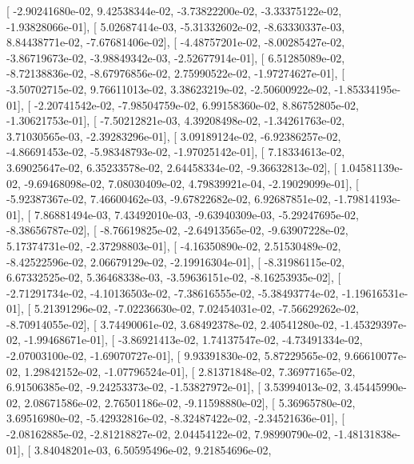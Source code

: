 \documentclass{article}
\begin{document}
       [ -2.90241680e-02,   9.42538344e-02,  -3.73822200e-02,
         -3.33375122e-02,  -1.93828066e-01],
       [  5.02687414e-03,  -5.31332602e-02,  -8.63330337e-03,
          8.84438771e-02,  -7.67681406e-02],
       [ -4.48757201e-02,  -8.00285427e-02,  -3.86719673e-02,
         -3.98849342e-03,  -2.52677914e-01],
       [  6.51285089e-02,  -8.72138836e-02,  -8.67976856e-02,
          2.75990522e-02,  -1.97274627e-01],
       [ -3.50702715e-02,   9.76611013e-02,   3.38623219e-02,
         -2.50600922e-02,  -1.85334195e-01],
       [ -2.20741542e-02,  -7.98504759e-02,   6.99158360e-02,
          8.86752805e-02,  -1.30621753e-01],
       [ -7.50212821e-03,   4.39208498e-02,  -1.34261763e-02,
          3.71030565e-03,  -2.39283296e-01],
       [  3.09189124e-02,  -6.92386257e-02,  -4.86691453e-02,
         -5.98348793e-02,  -1.97025142e-01],
       [  7.18334613e-02,   3.69025647e-02,   6.35233578e-02,
          2.64458334e-02,  -9.36632813e-02],
       [  1.04581139e-02,  -9.69468098e-02,   7.08030409e-02,
          4.79839921e-04,  -2.19029099e-01],
       [ -5.92387367e-02,   7.46600462e-03,  -9.67822682e-02,
          6.92687851e-02,  -1.79814193e-01],
       [  7.86881494e-03,   7.43492010e-03,  -9.63940309e-03,
         -5.29247695e-02,  -8.38656787e-02],
       [ -8.76619825e-02,  -2.64913565e-02,  -9.63907228e-02,
          5.17374731e-02,  -2.37298803e-01],
       [ -4.16350890e-02,   2.51530489e-02,  -8.42522596e-02,
          2.06679129e-02,  -2.19916304e-01],
       [ -8.31986115e-02,   6.67332525e-02,   5.36468338e-03,
         -3.59636151e-02,  -8.16253935e-02],
       [ -2.71291734e-02,  -4.10136503e-02,  -7.38616555e-02,
         -5.38493774e-02,  -1.19616531e-01],
       [  5.21391296e-02,  -7.02236630e-02,   7.02454031e-02,
         -7.56629262e-02,  -8.70914055e-02],
       [  3.74490061e-02,   3.68492378e-02,   2.40541280e-02,
         -1.45329397e-02,  -1.99468671e-01],
       [ -3.86921413e-02,   1.74137547e-02,  -4.73491334e-02,
         -2.07003100e-02,  -1.69070727e-01],
       [  9.93391830e-02,   5.87229565e-02,   9.66610077e-02,
          1.29842152e-02,  -1.07796524e-01],
       [  2.81371848e-02,   7.36977165e-02,   6.91506385e-02,
         -9.24253373e-02,  -1.53827972e-01],
       [  3.53994013e-02,   3.45445990e-02,   2.08671586e-02,
          2.76501186e-02,  -9.11598880e-02],
       [  5.36965780e-02,   3.69516980e-02,  -5.42932816e-02,
         -8.32487422e-02,  -2.34521636e-01],
       [ -2.08162885e-02,  -2.81218827e-02,   2.04454122e-02,
          7.98990790e-02,  -1.48131838e-01],
       [  3.84048201e-03,   6.50595496e-02,   9.21854696e-02,
\end{document}
